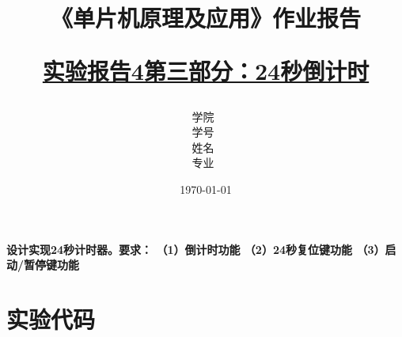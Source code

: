 \documentclass[12pt,hyperref,a4paper,UTF8]{ctexart}
\title{ 
        \vspace{1cm}
        \heiti \Huge \textbf{《单片机原理及应用》作业报告} \par
        \vspace{1cm} 
        \heiti \Large {\underline{实验报告4第三部分：24秒倒计时}   } 
        \vspace{3cm}
    
    }
\author{
        \vspace{0.5cm}
        \kaishu\Large 学院\ \dlmu[9cm]{卓越学院} \\ %
        \vspace{0.5cm}
        \kaishu\Large 学号\ \dlmu[9cm]{23040447} \\ %
        \vspace{0.5cm}
        \kaishu\Large 姓名\ \dlmu[9cm]{陈文轩} \qquad  \\ %
        \vspace{0.5cm}
        \kaishu\Large 专业\ \dlmu[9cm]{智能硬件与系统(电子信息工程)} \qquad \\ %
    }
\date{\today} %
\begin{document}
\cover
\thispagestyle{empty} %







\newpage
\setcounter{page}{1} %



\textbf{设计实现24秒计时器。要求：
（1）倒计时功能
（2）24秒复位键功能
（3）启动/暂停键功能}


\section{实验代码}
\end{document}
